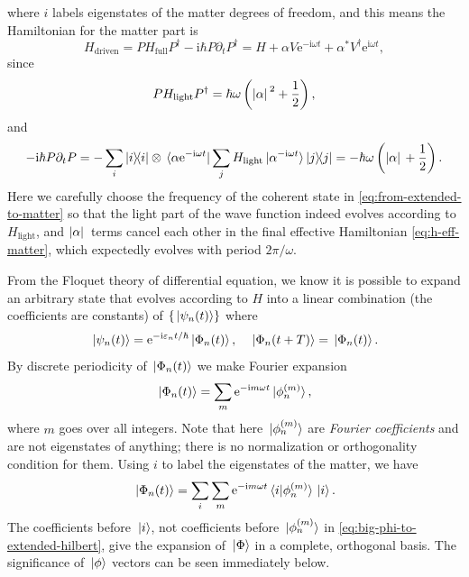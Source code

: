 \documentclass[hyperref, a4paper]{article}
\newcommand*{\ii}{\mathrm{i}}
\newcommand*{\ee}{\mathrm{e}}
\begin{document}
where $i$ labels eigenstates of the matter degrees of freedom,
and this means the Hamiltonian for the matter part is 
\begin{equation}
    H_{\text{driven}} = P H_{\text{full}} P^\dagger - \ii \hbar P \partial_t P^\dagger = 
    H + \alpha V \ee^{- \ii \omega t} + \alpha^* V^\dagger \ee^{\ii \omega t},
    \label{eq:h-eff-matter}
\end{equation}
since 
\[
    P H_{\text{light}} P^\dagger = \hbar \omega \left(\abs*{\alpha}^2 + \frac{1}{2}\right), 
\]
and 
\[
    - \ii \hbar P \partial_t P = - \sum_i \dyad{i} \otimes \bra*{\alpha \ee^{- \ii \omega t}} 
    \sum_j H_{\text{light}} \ket*{\alpha^{-\ii \omega t}} \dyad{j}
    = - \hbar \omega \left(\abs*{\alpha} + \frac{1}{2}\right) .
\]
Here we carefully choose the frequency of the coherent state in \eqref{eq:from-extended-to-matter}
so that the light part of the wave function indeed evolves according to $H_{\text{light}}$, 
and $\abs*{\alpha}$ terms cancel each other in the final effective Hamiltonian \eqref{eq:h-eff-matter},
which expectedly evolves with period $2\pi / \omega$.

From the Floquet theory of differential equation, 
we know it is possible to expand an arbitrary state that 
evolves according to $H$ into 
a linear combination (the coefficients are constants) of 
$\{\ket*{\psi_n(t)}\}$ where 
\begin{equation}
    \ket*{\psi_n (t)} = \ee^{- \ii \varepsilon_n t / \hbar} \ket*{\Phi_n(t)},
    \quad \ket*{\Phi_n(t + T)} = \ket*{\Phi_n(t)}.
    \label{eq:floquet-wave-function}
\end{equation}
By discrete periodicity of $\ket*{\Phi_n(t)}$ we make Fourier expansion 
\begin{equation}
    \ket*{\Phi_n(t)} = \sum_m \ee^{- \ii m \omega t} \ket*{\phi_n^{(m)}},
    \label{eq:big-phi-to-extended-hilbert}
\end{equation}
where $m$ goes over all integers.
Note that here $\ket*{\phi_n^{(m)}}$
are \emph{Fourier coefficients} and are not eigenstates of anything; 
there is no normalization or orthogonality condition for them.
Using $i$ to label the eigenstates of the matter, 
we have 
\begin{equation}
    \ket*{\Phi_n(t)} = \sum_{i} \sum_{m}
    \ee^{- \ii m \omega t} \braket*{i}{\phi_n^{(m)}} \ket*{i}.
\end{equation}
The coefficients before $\ket*{i}$, 
not coefficients before $\ket*{\phi_n^{(m)}}$ in \eqref{eq:big-phi-to-extended-hilbert}, 
give the expansion of $\ket*{\Phi}$ in a 
complete, orthogonal basis.
The significance of $\ket*{\phi}$ vectors can be seen immediately below.
\end{document}
